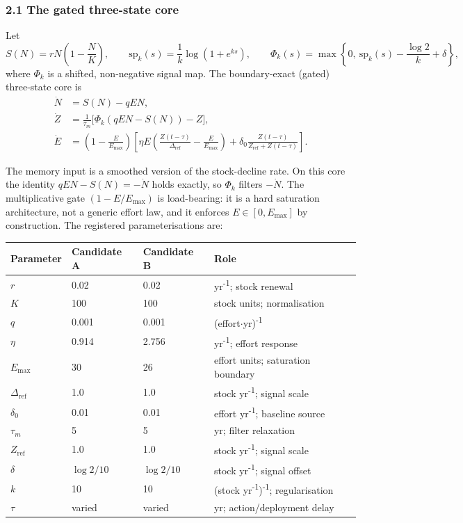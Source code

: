 \documentclass[11pt]{article}
\begin{document}
\subsubsection{2.1 The gated three-state
core}\label{the-gated-three-state-core}

Let
\[S(N) = rN\left(1 - \frac{N}{K}\right), \qquad \mathrm{sp}_k(s) = \frac{1}{k}\log(1 + e^{ks}), \qquad \Phi_k(s) = \max\left\{0,\ \mathrm{sp}_k(s) - \frac{\log 2}{k} + \delta\right\},\]
where \(\Phi_k\) is a shifted, non-negative signal map. The
boundary-exact (gated) three-state core is \[\begin{aligned}
\dot N &= S(N) - qEN, \\
\dot Z &= \frac{1}{\tau_m}\bigl[\Phi_k(qEN - S(N)) - Z\bigr], \\
\dot E &= \left(1 - \frac{E}{E_{\max}}\right)\left[\eta E\left(\frac{Z(t-\tau)}{\Delta_{\mathrm{ref}}} - \frac{E}{E_{\max}}\right) + \delta_0\frac{Z(t-\tau)}{Z_{\mathrm{ref}} + Z(t-\tau)}\right].
\end{aligned} \tag{1}\]

The memory input is a smoothed version of the stock-decline rate. On
this core the identity \(qEN - S(N) = -\dot N\) holds exactly, so
\(\Phi_k\) filters \(-\dot N\). The multiplicative gate
\((1 - E/E_{\max})\) is load-bearing: it is a hard saturation
architecture, not a generic effort law, and it enforces
\(E \in [0, E_{\max}]\) by construction. The registered
parameterisations are:

\begin{longtable}[]{@{}llll@{}}
\toprule\noalign{}
Parameter & Candidate A & Candidate B & Role \\
\midrule\noalign{}
\endhead
\bottomrule\noalign{}
\endlastfoot
\(r\) & 0.02 & 0.02 & yr\textsuperscript{-1}; stock renewal \\
\(K\) & 100 & 100 & stock units; normalisation \\
\(q\) & 0.001 & 0.001 & (effort\ensuremath{\cdot}yr)\textsuperscript{-1} \\
\(\eta\) & 0.914 & 2.756 & yr\textsuperscript{-1}; effort response \\
\(E_{\max}\) & 30 & 26 & effort units; saturation boundary \\
\(\Delta_{\mathrm{ref}}\) & 1.0 & 1.0 & stock yr\textsuperscript{-1}; signal scale \\
\(\delta_0\) & 0.01 & 0.01 & effort yr\textsuperscript{-1}; baseline source \\
\(\tau_m\) & 5 & 5 & yr; filter relaxation \\
\(Z_{\mathrm{ref}}\) & 1.0 & 1.0 & stock yr\textsuperscript{-1}; signal scale \\
\(\delta\) & \(\log 2/10\) & \(\log 2/10\) & stock yr\textsuperscript{-1}; signal
offset \\
\(k\) & 10 & 10 & (stock yr\textsuperscript{-1})\textsuperscript{-1}; regularisation \\
\(\tau\) & varied & varied & yr; action/deployment delay \\
\end{longtable}
\end{document}
